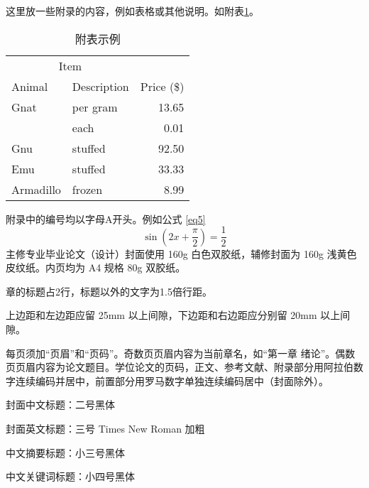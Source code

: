 \documentclass{xmu}
\begin{document}

\begin{appendix}
    这里放一些附录的内容，例如表格或其他说明。如附表\ref{atable}。
    \begin{table}[!htb]
        \centering
        \caption{附表示例}
        \label{atable}
        \begin{tabular}{llr}
            \hline
            \multicolumn{2}{c}{Item} &                          \\ \cline{1-2}
            Animal                   & Description & Price (\$) \\ \hline
            Gnat                     & per gram    & 13.65      \\
                                     & each        & 0.01       \\
            Gnu                      & stuffed     & 92.50      \\
            Emu                      & stuffed     & 33.33      \\
            Armadillo                & frozen      & 8.99       \\ \hline
        \end{tabular}
    \end{table}
    附录中的编号均以字母A开头。例如公式 \ref{eq5}
    \begin{equation}\label{eq5}
        \sin \left(2x+\frac\pi2\right)=\frac 12
    \end{equation}
    主修专业毕业论文（设计）封面使用 160g 白色双胶纸，辅修封面为 160g 浅黄色皮纹纸。内页均为 A4 规格 80g 双胶纸。\par
    章的标题占2行，标题以外的文字为1.5倍行距。\par
    上边距和左边距应留 25mm 以上间隙，下边距和右边距应分别留 20mm 以上间隙。\par
    每页须加“页眉”和“页码”。奇数页页眉内容为当前章名，如“第一章 绪论”。偶数页页眉内容为论文题目。学位论文的页码，正文、参考文献、附录部分用阿拉伯数字连续编码并居中，前置部分用罗马数字单独连续编码居中（封面除外）。\par
    封面中文标题：二号黑体\par
    封面英文标题：三号 Times New Roman 加粗\par
    中文摘要标题：小三号黑体\par
    中文关键词标题：小四号黑体\par

\end{appendix}
\end{document}
